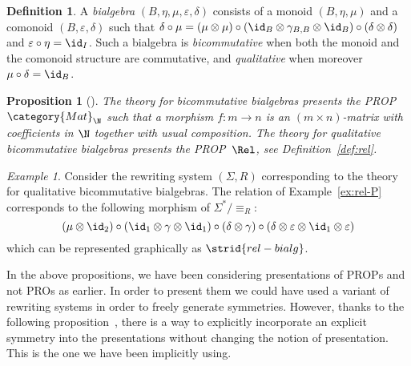 \documentclass[submission,copyright,creativecommons]{eptcs}
\newtheorem{proposition}[theorem]{Proposition}
\theoremstyle{definition}
\newtheorem{definition}[theorem]{Definition}
\theoremstyle{remark}
\newtheorem{example}[theorem]{Example}
\begin{document}
\begin{definition}
  \label{def:bialg}
  A \emph{bialgebra} $(B,\eta,\mu,\varepsilon,\delta)$ consists of a monoid
  $(B,\eta,\mu)$ and a comonoid $(B,\varepsilon,\delta)$ such that
  $\delta\circ\mu=(\mu\otimes\mu)\circ(\id_B\otimes\gamma_{B,B}\otimes\id_B)\circ(\delta\otimes\delta)$
  and $\varepsilon\circ\eta=\id_I$. Such a bialgebra is \emph{bicommutative}
  when both the monoid and the comonoid structure are commutative, and
  \emph{qualitative} when moreover $\mu\circ\delta=\id_B$.
\end{definition}

\begin{proposition}[\cite{maclane1965categorical, hyland2000symmetric, pirashvili2001prop, lafont2003towards, lack2004composing, mimram2011structure}]
  \label{prop:free-bialgebra}
  The theory for bicommutative bialgebras presents the PROP~$\category{Mat}_\N$
  such that a morphism $f:m\to n$ is an $(m\times n)$-matrix with coefficients
  in $\N$ together with usual composition. The theory for qualitative
  bicommutative bialgebras presents the PROP~$\Rel$, see
  Definition~\ref{def:rel}.
\end{proposition}

\begin{example}
  Consider the rewriting system $(\Sigma,R)$ corresponding to the theory for
  qualitative bicommutative bialgebras. The relation of Example~\ref{ex:rel-P}
  corresponds to the following morphism of $\Sigma^*/{\equiv_R}$:
  \[
  (\mu\otimes\id_2)
  \circ
  (\id_1\otimes\gamma\otimes\id_1)
  \circ
  (\delta\otimes\gamma)
  \circ
  (\delta\otimes\varepsilon\otimes\id_1\otimes\varepsilon)
  \]
  which can be represented graphically as
  $
  \strid{rel-bialg}
  $.
\end{example}

In the above propositions, we have been considering presentations of PROPs and
not PROs as earlier. In order to present them we could have used a variant of
rewriting systems in order to freely generate symmetries. However, thanks to the
following proposition~\cite{burroni1993higher}, there is a way to explicitly
incorporate an explicit symmetry into the presentations without changing the
notion of presentation. This is the one we have been implicitly using.
\end{document}

